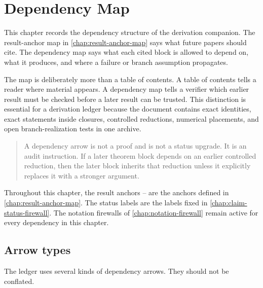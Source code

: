 \chapter{Dependency Map}
\label{chap:dependency-map}

This chapter records the dependency structure of the derivation companion.  The result-anchor map in \cref{chap:result-anchor-map} says what future papers should cite.  The dependency map says what each cited block is allowed to depend on, what it produces, and where a failure or branch assumption propagates.

The map is deliberately more than a table of contents.  A table of contents tells a reader where material appears.  A dependency map tells a verifier which earlier result must be checked before a later result can be trusted.  This distinction is essential for a derivation ledger because the document contains exact identities, exact statements inside closures, controlled reductions, numerical placements, and open branch-realization tests in one archive.

\begin{quote}
A dependency arrow is not a proof and is not a status upgrade.  It is an audit instruction.  If a later theorem block depends on an earlier controlled reduction, then the later block inherits that reduction unless it explicitly replaces it with a stronger argument.
\end{quote}

Throughout this chapter, the result anchors -- are the anchors defined in \cref{chap:result-anchor-map}.  The status labels are the labels fixed in \cref{chap:claim-status-firewall}.  The notation firewalls of \cref{chap:notation-firewall} remain active for every dependency in this chapter.

\section{Arrow types}
\label{sec:dependency-arrow-types}

The ledger uses several kinds of dependency arrows.  They should not be conflated.

